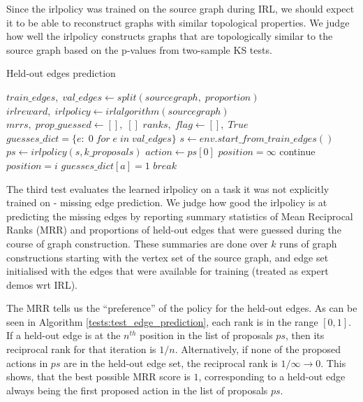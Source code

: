 \documentclass{report}
\numberwithin{equation}{section}
\numberwithin{figure}{section}
\numberwithin{table}{section}
\numberwithin{algorithm}{section}
\begin{document}
Since the irlpolicy was trained on the source graph during IRL, 
we should expect it to be able to reconstruct graphs with similar 
topological properties. We judge how well the irlpolicy constructs 
graphs that are topologically similar to the source graph 
based on the p-values 
from two-sample KS tests.

\begin{algorithm}
  \caption{Held-out edges prediction}
  \label{tests:test_edge_prediction}
  \begin{algorithmic}
    \State $train\_edges,\; val\_edges \gets split(sourcegraph,\; proportion)$
    \State $irlreward,\; irlpolicy \gets irlalgorithm(sourcegraph)$
    \State $mrrs,\; prop\_guessed \gets [],\;[]$
      \State $ranks,\; flag \gets [],\; True$
      \State $guesses\_dict=\{e:\; 0\; for\; e\; in\; val\_edges\}$
      \State $s \gets env.start\_from\_train\_edges()$
        \State $ps \gets irlpolicy(s, k\_proposals)$
        \State $action\gets ps[0]$
        \State $position=\infty$
            \State continue
          \EndIf
          \EndIf
            \State $position=i$
            \State $guesses\_dict[a] = 1$
            \State $break$
          \EndIf
        \EndFor
      \EndWhile
    \EndFor
  \end{algorithmic}
\end{algorithm}

The third test evaluates the learned irlpolicy on a task it was not 
explicitly trained on - missing edge prediction. We judge how good 
the irlpolicy is at predicting the missing edges by reporting summary 
statistics of Mean Reciprocal Ranks (MRR) and proportions of held-out 
edges that were guessed during the course of graph construction.
These summaries are done over $k$ runs 
of graph constructions starting with the vertex set of the source 
graph, and edge set initialised with the edges that were 
available for training (treated as expert demos wrt IRL). 

The MRR tells us the ``preference'' 
of the policy for the held-out edges. As can be seen in Algorithm 
\ref{tests:test_edge_prediction}, each rank is in the range $[0, 1]$. 
If a held-out edge is at the $n^{th}$ position in the list of proposals 
$ps$, then its reciprocal rank for that iteration is $1/n$. Alternatively, 
if none of the proposed actions in $ps$ are in the held-out edge set, 
the reciprocal rank is $1/\infty\rightarrow 0$. This shows, that the 
best possible MRR score is $1$, corresponding to a held-out edge 
always being the first proposed action in the list of proposals $ps$.
\end{document}
